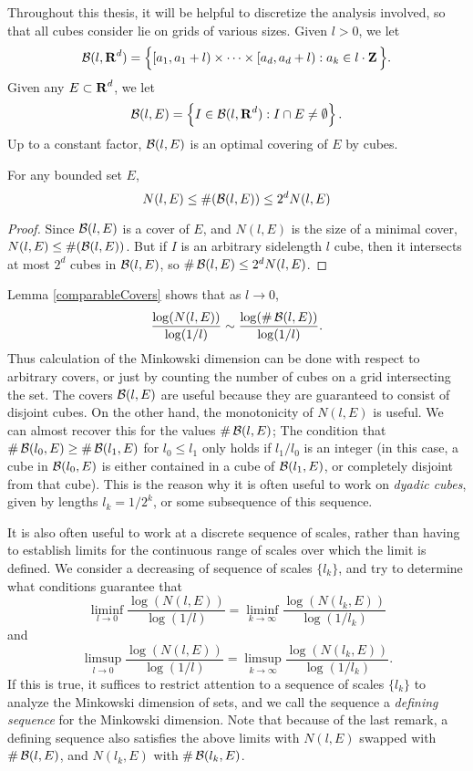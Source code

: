 Throughout this thesis, it will be helpful to discretize the analysis involved, so that all cubes consider lie on grids of various sizes. Given $l > 0$, we let
%
\[ \operatorname{\mathcal{B}}(l,\operatorname{\mathbf{R}}^d) = \Big\{ [a_1,a_1 + l) \times \cdots \times [a_d,a_d + l): a_k \in l \cdot \operatorname{\mathbf{Z}} \Big\}. \]
%
Given any $E \subset \operatorname{\mathbf{R}}^d$, we let
%
\[ \operatorname{\mathcal{B}}(l,E) = \left\{ I \in \operatorname{\mathcal{B}}(l,\operatorname{\mathbf{R}}^d): I \cap E \neq \emptyset \right\}. \]
%
Up to a constant factor, $\operatorname{\mathcal{B}}(l,E)$ is an optimal covering of $E$ by cubes.

\begin{lemma} \label{comparableCovers}
	For any bounded set $E$,
	\[ N(l,E) \leq \#(\operatorname{\mathcal{B}}(l,E)) \leq 2^d N(l,E) \]
\end{lemma}
\begin{proof}
	Since $\operatorname{\mathcal{B}}(l,E)$ is a cover of $E$, and $N(l,E)$ is the size of a minimal cover, $N(l,E) \leq \#(\operatorname{\mathcal{B}}(l,E))$. But if $I$ is an arbitrary sidelength $l$ cube, then it intersects at most $2^d$ cubes in $\operatorname{\mathcal{B}}(l,E)$, so $\# \operatorname{\mathcal{B}}(l,E) \leq 2^d N(l,E)$.
\end{proof}

\begin{remark}
	Lemma \ref{comparableCovers} shows that as $l \to 0$,
	\[ \frac{\log(N(l,E))}{\log(1/l)} \sim \frac{\log(\# \operatorname{\mathcal{B}}(l,E))}{\log(1/l)}. \]
	Thus calculation of the Minkowski dimension can be done with respect to arbitrary covers, or just by counting the number of cubes on a grid intersecting the set. The covers $\operatorname{\mathcal{B}}(l,E)$ are useful because they are guaranteed to consist of disjoint cubes. On the other hand, the monotonicity of $N(l,E)$ is useful. We can almost recover this for the values $\# \operatorname{\mathcal{B}}(l,E)$; The condition that $\# \operatorname{\mathcal{B}}(l_0,E) \geq \# \operatorname{\mathcal{B}}(l_1,E)$ for $l_0 \leq l_1$ only holds if $l_1/l_0$ is an integer (in this case, a cube in $\operatorname{\mathcal{B}}(l_0,E)$ is either contained in a cube of $\operatorname{\mathcal{B}}(l_1,E)$, or completely disjoint from that cube). This is the reason why it is often useful to work on \emph{dyadic cubes}, given by lengths $l_k = 1/2^k$, or some subsequence of this sequence.
\end{remark}

It is also often useful to work at a discrete sequence of scales, rather than having to establish limits for the continuous range of scales over which the limit is defined. We consider a decreasing of sequence of scales $\{ l_k \}$, and try to determine what conditions guarantee that
%
\[ \liminf_{l \to 0} \frac{\log(N(l,E))}{\log(1/l)} = \liminf_{k \to \infty} \frac{\log(N(l_k,E))}{\log(1/l_k)} \]
%
and
%
\[ \limsup_{l \to 0} \frac{\log(N(l,E))}{\log(1/l)} = \limsup_{k \to \infty} \frac{\log(N(l_k,E))}{\log(1/l_k)}. \]
%
If this is true, it suffices to restrict attention to a sequence of scales $\{ l_k \}$ to analyze the Minkowski dimension of sets, and we call the sequence a \emph{defining sequence} for the Minkowski dimension. Note that because of the last remark, a defining sequence also satisfies the above limits with $N(l,E)$ swapped with $\# \operatorname{\mathcal{B}}(l,E)$, and $N(l_k,E)$ with $\# \operatorname{\mathcal{B}}(l_k,E)$.

